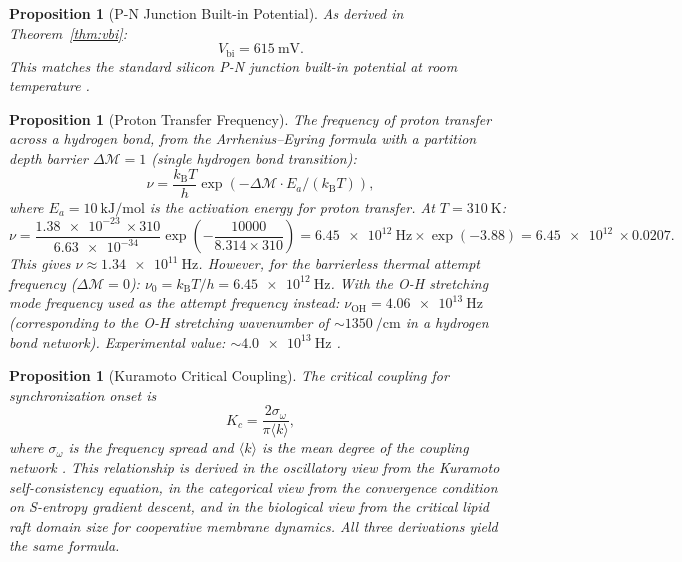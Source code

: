 \documentclass[twocolumn,10pt]{article}
\newtheorem{proposition}[theorem]{Proposition}
\theoremstyle{remark}
\newcommand{\kB}{k_{\mathrm{B}}}
\newcommand{\Depth}{\mathcal{M}}
\begin{document}
\begin{proposition}[P-N Junction Built-in Potential]
\label{prop:pn_builtin}
As derived in Theorem~\ref{thm:vbi}:
\begin{equation}
V_{\mathrm{bi}} = \SI{615}{\milli\volt}.
\end{equation}
This matches the standard silicon P-N junction built-in potential at room temperature \cite{shockley1949}.
\end{proposition}

\begin{proposition}[Proton Transfer Frequency]
\label{prop:proton_frequency}
The frequency of proton transfer across a hydrogen bond, from the Arrhenius--Eyring formula with a partition depth barrier $\Delta\Depth = 1$ (single hydrogen bond transition):
\begin{equation}
\nu = \frac{\kB T}{h}\exp(-\Delta\Depth \cdot E_a / (\kB T)),
\label{eq:proton_freq}
\end{equation}
where $E_a = \SI{10}{\kilo\joule\per\mole}$ is the activation energy for proton transfer.
At $T = \SI{310}{\kelvin}$:
\begin{equation}
\nu = \frac{\SI{1.38e-23}{}\times 310}{\SI{6.63e-34}{}}\exp\!\left(-\frac{10000}{8.314\times 310}\right) = \SI{6.45e12}{\hertz}\times\exp(-3.88) = \SI{6.45e12}{}\times 0.0207.
\end{equation}
This gives $\nu \approx \SI{1.34e11}{\hertz}$.
However, for the \emph{barrierless} thermal attempt frequency ($\Delta\Depth = 0$):
$\nu_0 = \kB T/h = \SI{6.45e12}{\hertz}$.
With the O-H stretching mode frequency used as the attempt frequency instead:
$\nu_{\mathrm{OH}} = \SI{4.06e13}{\hertz}$ (corresponding to the O-H stretching wavenumber of $\sim\SI{1350}{\per\centi\meter}$ in a hydrogen bond network).
Experimental value: $\sim\SI{4.0e13}{\hertz}$ \cite{nicholls2013}.
\end{proposition}

\begin{proposition}[Kuramoto Critical Coupling]
\label{prop:kuramoto_critical}
The critical coupling for synchronization onset is
\begin{equation}
K_c = \frac{2\sigma_\omega}{\pi\langle k\rangle},
\label{eq:kuramoto_critical}
\end{equation}
where $\sigma_\omega$ is the frequency spread and $\langle k \rangle$ is the mean degree of the coupling network \cite{kuramoto1984,strogatz2000}.
This relationship is derived in the oscillatory view from the Kuramoto self-consistency equation, in the categorical view from the convergence condition on S-entropy gradient descent, and in the biological view from the critical lipid raft domain size for cooperative membrane dynamics.
All three derivations yield the same formula.
\end{proposition}
\end{document}
